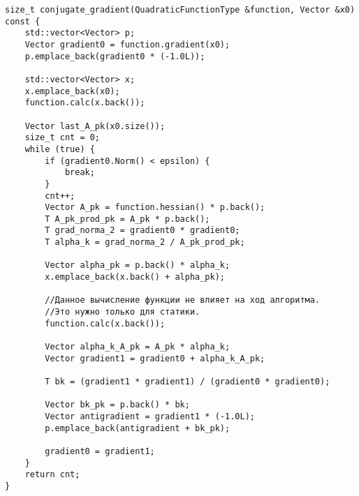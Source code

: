 \begin{lstlisting}
size_t conjugate_gradient(QuadraticFunctionType &function, Vector &x0) const {
    std::vector<Vector> p;
    Vector gradient0 = function.gradient(x0);
    p.emplace_back(gradient0 * (-1.0L));

    std::vector<Vector> x;
    x.emplace_back(x0);
    function.calc(x.back());

    Vector last_A_pk(x0.size());
    size_t cnt = 0;
    while (true) {
        if (gradient0.Norm() < epsilon) {
            break;
        }
        cnt++;
        Vector A_pk = function.hessian() * p.back();
        T A_pk_prod_pk = A_pk * p.back();
        T grad_norma_2 = gradient0 * gradient0;
        T alpha_k = grad_norma_2 / A_pk_prod_pk;

        Vector alpha_pk = p.back() * alpha_k;
        x.emplace_back(x.back() + alpha_pk);

        //Данное вычисление функции не влияет на ход алгоритма.
        //Это нужно только для статики.
        function.calc(x.back());

        Vector alpha_k_A_pk = A_pk * alpha_k;
        Vector gradient1 = gradient0 + alpha_k_A_pk;

        T bk = (gradient1 * gradient1) / (gradient0 * gradient0);

        Vector bk_pk = p.back() * bk;
        Vector antigradient = gradient1 * (-1.0L);
        p.emplace_back(antigradient + bk_pk);

        gradient0 = gradient1;
    }
    return cnt;
}

\end{lstlisting}

